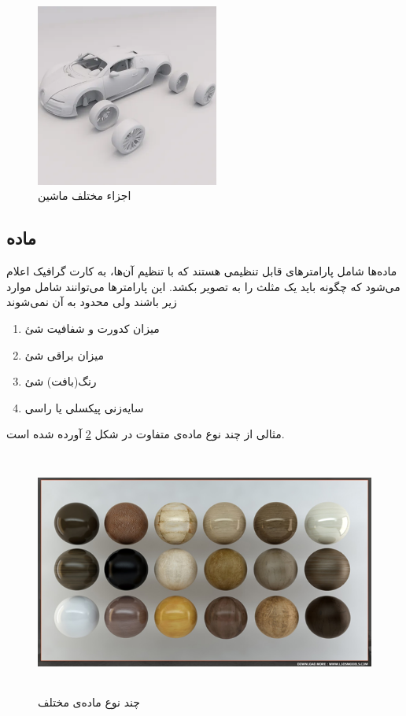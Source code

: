 \begin{figure}[ht]
	\centerline{\includegraphics[width=\textwidth,height=6cm,keepaspectratio]{Figures/Ch2/Car.png}}

	\caption{اجزاء مختلف ماشین\cite{CarSource}}
	\label{fig:Car}
\end{figure}

\subsection{ماده 
\protect{}
}
ماده‌ها شامل پارامتر‌های قابل تنظیمی هستند که با تنظیم آن‌ها، به کارت گرافیک اعلام می‌شود که چگونه باید یک مثلث را به تصویر بکشد.
این پارامترها می‌توانند شامل موارد زیر باشند ولی محدود به آن نمی‌شوند

\begin{enumerate}
	\item میزان کدورت و شفافیت شئ
 	\item میزان براقی شئ
 	\item رنگ(بافت) شئ
 	\item سایه‌زنی پیکسلی یا راسی \protect{}
\end{enumerate}

مثالی از چند نوع ماده‌ی متفاوت در شکل 
\ref{fig:Material}
آورده‌ شده است.

\begin{figure}[ht]
	\centerline{\includegraphics[width=\textwidth,height=8cm,keepaspectratio]{Figures/Ch2/Material.png}}

	\caption{چند نوع ماده‌ی مختلف\cite{MaterialSource}}
	\label{fig:Material}
\end{figure}


